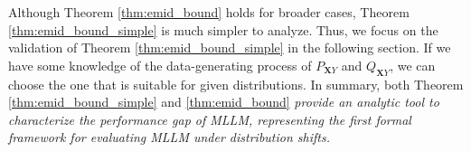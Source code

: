 Although Theorem \ref{thm:emid_bound} holds for broader cases, Theorem \ref{thm:emid_bound_simple} is much simpler to analyze. Thus, we focus on the validation of Theorem \ref{thm:emid_bound_simple} in the following section. If we have some knowledge of the data-generating process of $P_{\mathbf{X}Y}$ and $Q_{\mathbf{X}Y}$, we can choose the one that is suitable for given distributions. In summary, both Theorem \ref{thm:emid_bound_simple} and \ref{thm:emid_bound} {\textit{provide an analytic tool to characterize the performance gap of MLLM, representing the first formal framework for evaluating MLLM under distribution shifts.}}